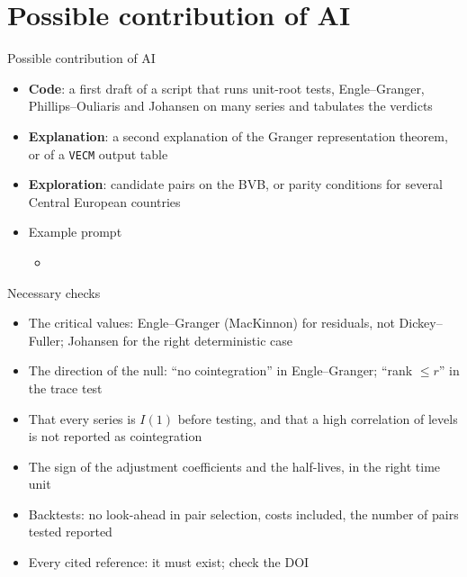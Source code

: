 \section{Possible contribution of AI}

\begin{frame}{Possible contribution of AI}
\itemsize{\small}
\begin{itemize}
    \item \textbf{Code}: a first draft of a script that runs unit-root tests, Engle--Granger, Phillips--Ouliaris and Johansen on many series and tabulates the verdicts
    \item \textbf{Explanation}: a second explanation of the Granger representation theorem, or of a \texttt{VECM} output table
    \item \textbf{Exploration}: candidate pairs on the BVB, or parity conditions for several Central European countries
    \item Example prompt
    \begin{itemize}
        \item {}
    \end{itemize}
\end{itemize}
\end{frame}

\begin{frame}{Necessary checks}
\itemsize{\small}
\begin{itemize}
    \item The critical values: Engle--Granger (MacKinnon) for residuals, not Dickey--Fuller; Johansen for the right deterministic case
    \item The direction of the null: ``no cointegration'' in Engle--Granger; ``rank $\le r$'' in the trace test
    \item That every series is $I(1)$ before testing, and that a high correlation of levels is not reported as cointegration
    \item The sign of the adjustment coefficients and the half-lives, in the right time unit
    \item Backtests: no look-ahead in pair selection, costs included, the number of pairs tested reported
    \item Every cited reference: it must exist; check the DOI
\end{itemize}
\end{frame}


